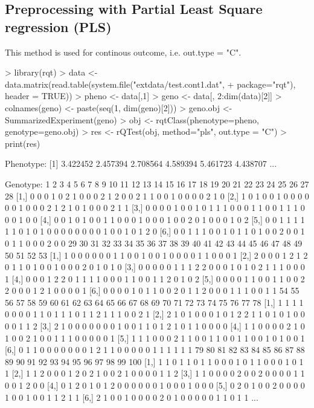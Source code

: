 \documentclass{article}
\begin{document}
\subsection{Preprocessing with Partial Least Square regression (PLS)}

This method is used for continous outcome, i.e. out.type = "C".
\begin{Schunk}
\begin{Sinput}
> library(rqt)
> data <- data.matrix(read.table(system.file("extdata/test.cont1.dat",
+                                            package="rqt"), header = TRUE))
> pheno <- data[,1]
> geno <- data[, 2:dim(data)[2]]
> colnames(geno) <- paste(seq(1, dim(geno)[2]))
> geno.obj <- SummarizedExperiment(geno)
> obj <- rqtClass(phenotype=pheno, genotype=geno.obj)
> res <- rQTest(obj, method="pls", out.type = "C")
> print(res)
\end{Sinput}
\begin{Soutput}
Phenotype:
[1] 3.422452 2.457394 2.708564 4.589394 5.461723 4.438707
...

Genotype:
     1 2 3 4 5 6 7 8 9 10 11 12 13 14 15 16 17 18 19 20 21 22 23 24 25 26 27 28
[1,] 0 0 0 1 0 2 1 0 0  0  2  1  2  0  0  2  1  1  0  0  1  0  0  0  0  2  1  0
[2,] 1 0 1 0 0 1 0 0 0  0  0  0  1  0  0  0  2  1  2  1  0  1  0  0  0  2  1  1
[3,] 0 0 0 0 1 0 0 1 0  1  1  1  0  0  0  1  1  0  0  1  1  1  0  0  0  1  0  0
[4,] 0 0 1 0 1 0 0 1 1  0  0  0  1  0  0  0  1  0  0  2  0  1  0  0  0  1  0  2
[5,] 0 0 1 1 1 1 1 1 0  1  0  1  0  0  0  0  0  0  0  0  1  0  0  1  0  1  2  0
[6,] 0 0 1 1 1 0 0 1 0  1  1  0  1  0  0  2  0  0  1  0  1  1  0  0  0  2  0  0
     29 30 31 32 33 34 35 36 37 38 39 40 41 42 43 44 45 46 47 48 49 50 51 52 53
[1,]  1  0  0  0  0  0  0  1  1  0  0  1  0  0  1  0  0  0  0  1  1  0  0  0  1
[2,]  2  0  0  0  1  2  1  2  0  1  1  0  1  0  0  1  0  0  0  2  0  1  0  1  0
[3,]  0  0  0  0  0  1  1  1  2  2  0  0  0  1  0  1  0  2  1  1  1  0  0  0  1
[4,]  0  0  0  1  2  2  0  1  1  1  1  0  0  0  1  1  0  0  1  1  2  0  1  0  2
[5,]  0  0  0  0  1  1  0  0  1  1  0  0  2  2  0  0  0  1  2  1  0  0  0  0  1
[6,]  0  0  0  0  1  0  1  1  0  0  2  0  1  1  2  0  0  0  1  1  1  0  0  1  1
     54 55 56 57 58 59 60 61 62 63 64 65 66 67 68 69 70 71 72 73 74 75 76 77 78
[1,]  1  1  1  1  0  0  0  0  1  1  0  1  1  1  0  1  1  2  1  1  1  0  0  2  1
[2,]  2  1  0  1  0  0  0  1  0  1  2  2  1  1  0  1  0  1  0  0  0  0  1  1  2
[3,]  2  1  0  0  0  0  0  0  0  1  0  0  1  1  0  1  2  1  0  1  1  0  0  0  0
[4,]  1  1  0  0  0  0  2  1  0  1  0  0  2  1  0  0  1  1  1  0  0  0  0  0  1
[5,]  1  1  1  0  0  0  2  1  1  0  0  1  1  0  0  1  1  0  0  1  0  1  0  0  1
[6,]  0  1  1  0  0  0  0  0  0  0  1  2  1  1  0  0  0  0  0  1  1  1  1  1  1
     79 80 81 82 83 84 85 86 87 88 89 90 91 92 93 94 95 96 97 98 99 100
[1,]  1  1  0  1  1  0  1  1  0  0  0  1  0  1  1  0  0  0  1  0  1   1
[2,]  1  1  2  0  0  0  1  2  0  2  1  0  0  2  1  0  0  0  0  1  1   2
[3,]  1  1  0  0  0  0  2  0  0  2  0  0  0  0  1  1  0  0  1  2  0   0
[4,]  0  1  2  0  1  0  1  2  0  0  0  0  0  0  1  0  0  0  1  0  0   0
[5,]  0  2  0  1  0  0  2  0  0  0  0  1  0  0  1  0  0  1  1  2  1   1
[6,]  2  1  0  0  1  0  0  0  0  2  0  1  0  0  0  0  0  1  1  0  1   1
...


\end{Soutput}
\end{Schunk}
\end{document}
